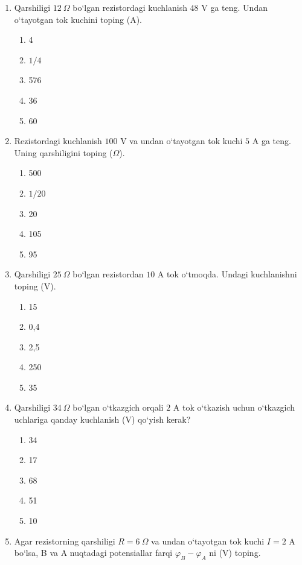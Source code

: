 \begin{enumerate}
\item Qarshiligi $12~\Omega$ bo‘lgan rezistordagi kuchlanish $48$ V ga teng. Undan o‘tayotgan tok kuchini toping (A).
\begin{enumerate}[label=\Alph*)]
\item 4
\item $1/4$
\item 576
\item 36
\item 60
\end{enumerate}

\item Rezistordagi kuchlanish $100$ V va undan o‘tayotgan tok kuchi $5$ A ga teng. Uning qarshiligini toping ($\Omega$).
\begin{enumerate}[label=\Alph*)]
\item 500
\item $1/20$
\item 20
\item 105
\item 95
\end{enumerate}

\item Qarshiligi $25~\Omega$ bo‘lgan rezistordan $10$ A tok o‘tmoqda. Undagi kuchlanishni toping (V).
\begin{enumerate}[label=\Alph*)]
\item 15
\item 0,4
\item 2,5
\item 250
\item 35
\end{enumerate}

\item Qarshiligi $34~\Omega$ bo‘lgan o‘tkazgich orqali $2$ A tok o‘tkazish uchun o‘tkazgich uchlariga qanday kuchlanish (V) qo‘yish kerak?
\begin{enumerate}[label=\Alph*)]
\item 34
\item 17
\item 68
\item 51
\item 10
\end{enumerate}

\item Agar rezistorning qarshiligi $R=6~\Omega$ va undan o‘tayotgan tok kuchi $I=2$ A bo‘lsa, B va A nuqtadagi potensiallar farqi $\varphi_B-\varphi_A$ ni (V) toping.

\begin{tikzpicture}[scale=0.8]


\end{tikzpicture}
\end{enumerate}
